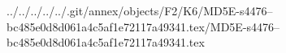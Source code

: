 ../../../../../.git/annex/objects/F2/K6/MD5E-s4476--bc485e0d8d061a4c5af1e72117a49341.tex/MD5E-s4476--bc485e0d8d061a4c5af1e72117a49341.tex